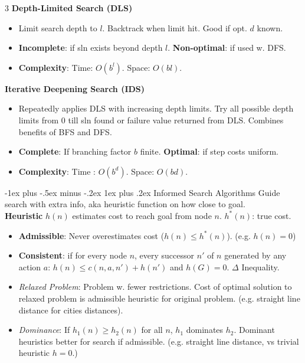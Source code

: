 \documentclass[a4paper, 9pt, landscape]{article}
\makeatletter
\renewcommand{\subsubsection}{\@startsection{subsubsection}{3}{0mm}%
                                {-1ex plus -.5ex minus -.2ex}%
                                {1ex plus .2ex}%
                                {\normalfont\small\bfseries}}
\makeatother
\begin{document}
\begin{multicols*}{3}
\textbf{Depth-Limited Search (DLS)}
\begin{itemize}
    \item Limit search depth to $l$. Backtrack when limit hit. Good if opt. $d$ known.
    \item \textbf{Incomplete}: if sln exists beyond depth $l$. \textbf{Non-optimal}: if used w. DFS.
    \item \textbf{Complexity}: Time: $O(b^l)$. Space: $O(bl)$.
\end{itemize}
\smallskip
\textbf{Iterative Deepening Search (IDS)}
\begin{itemize}
    \item Repeatedly applies DLS with increasing depth limits. Try all possible depth limits from 0 till sln found or failure value returned from DLS. Combines benefits of BFS and DFS.
    \item \textbf{Complete}: If branching factor $b$ finite. \textbf{Optimal}: if step costs uniform.
    \item \textbf{Complexity}: Time : $O(b^d)$. Space: $O(bd)$.
\end{itemize}

\subsubsection{Informed Search Algorithms}
Guide search with extra info, aka heuristic function on how close to goal. \\
\textbf{Heuristic} $h(n)$ estimates cost to reach goal from node $n$. $h^*(n)$: true cost.
\begin{itemize}
\item \textbf{Admissible}: Never overestimates cost ($h(n) \leq h^*(n)$). (e.g. $h(n)=0$) 
\item \textbf{Consistent}: if for every node $n$, every successor $n'$ of $n$ generated by any action $a$:
   $h(n) \leq c(n, a, n') + h(n')$ and $h(G) = 0$. $\Delta$ Inequality.
\item \textit{Relaxed Problem}: Problem w. fewer restrictions. Cost of optimal solution to relaxed problem is admissible heuristic for original problem. (e.g. straight line distance for cities distances).
\item \textit{Dominance}: If $h_1(n) \geq h_2(n)$ for all $n$, $h_1$ dominates $h_2$. Dominant heuristics better for search if admissible. (e.g. straight line distance, vs trivial heuristic $h = 0$.)
\end{itemize}
\columnbreak


\end{multicols*}
\end{document}
